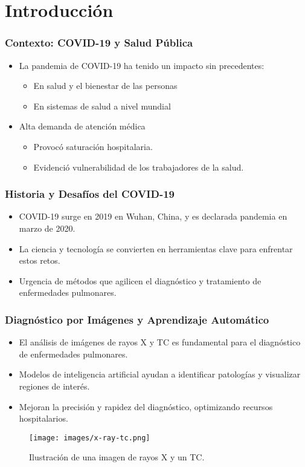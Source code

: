 
\section{Introducción}

\begin{frame}
\frametitle{Contexto: COVID-19 y Salud Pública}
\begin{itemize}
    \item La pandemia de COVID-19 ha tenido un impacto sin precedentes:
    \begin{itemize}
        \item En salud y el bienestar de las personas
        \item En sistemas de salud a nivel mundial
    \end{itemize}
\end{itemize}

\begin{itemize}
    \item Alta demanda de atención médica
    \begin{itemize}
        \item Provocó saturación hospitalaria.
        \item Evidenció vulnerabilidad de los trabajadores de la salud.
    \end{itemize}
\end{itemize}
\end{frame}

\begin{frame}
\frametitle{Historia y Desafíos del COVID-19}
\begin{itemize}
    \item COVID-19 surge en 2019 en Wuhan, China, y es declarada pandemia en marzo de 2020.
    \item La ciencia y tecnología se convierten en herramientas clave para enfrentar estos retos.
    \item Urgencia de métodos que agilicen el diagnóstico y tratamiento de enfermedades pulmonares.
\end{itemize}
\end{frame}

\begin{frame}
\frametitle{Diagnóstico por Imágenes y Aprendizaje Automático}
\begin{itemize}
    \item El análisis de imágenes de rayos X y TC es fundamental para el diagnóstico de enfermedades pulmonares.
    \item Modelos de inteligencia artificial ayudan a identificar patologías y visualizar regiones de interés.
    \item Mejoran la precisión y rapidez del diagnóstico, optimizando recursos hospitalarios.
\end{itemize}
\begin{figure}[ht!]
    \centering
    \texttt{[image: images/x-ray-tc.png]}
    \caption{Ilustración de una imagen de rayos X y un TC.}
\end{figure}
\end{frame}


